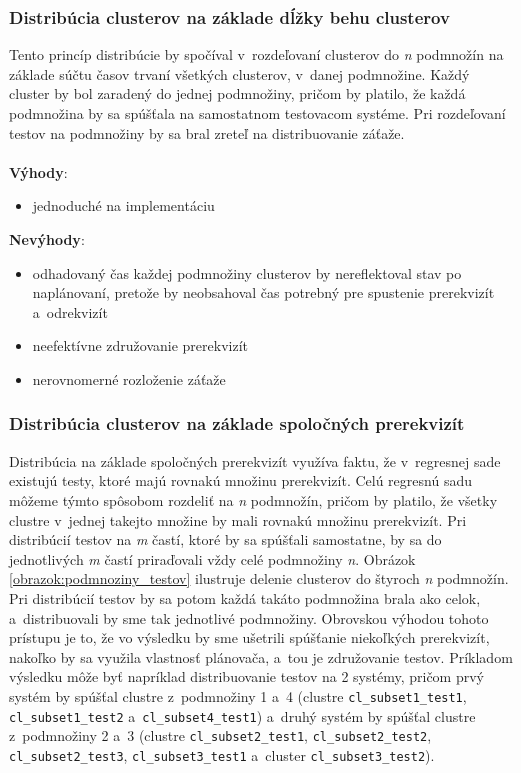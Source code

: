 \subsubsection*{Distribúcia clusterov na základe dĺžky behu clusterov}
Tento princíp distribúcie by spočíval v~rozdeľovaní clusterov do \textit{n} podmnožín na základe súčtu časov 
trvaní všetkých clusterov, v~danej podmnožine. Každý cluster by bol zaradený do jednej podmnožiny, pričom by platilo,
že každá podmnožina by sa spúšťala na samostatnom testovacom systéme. Pri rozdeľovaní testov na podmnožiny by sa bral zreteľ na
distribuovanie záťaže.
\\
\\
\noindent \textbf{Výhody}:
\begin{itemize}
\item jednoduché na implementáciu
\end{itemize} 

\noindent \textbf{Nevýhody}:
\begin{itemize}
\item odhadovaný čas každej podmnožiny clusterov by nereflektoval stav po naplánovaní, pretože by
neobsahoval čas potrebný pre spustenie prerekvizít a~odrekvizít
\item neefektívne združovanie prerekvizít
\item nerovnomerné rozloženie záťaže
\end{itemize}

\subsubsection*{Distribúcia clusterov na základe spoločných prerekvizít}
Distribúcia na základe spoločných prerekvizít využíva faktu, že v~regresnej sade existujú testy, ktoré majú rovnakú množinu prerekvizít.
Celú regresnú sadu môžeme týmto spôsobom rozdeliť na \emph{n} podmnožín, pričom by platilo, že všetky clustre v~jednej takejto množine by mali
rovnakú množinu prerekvizít. Pri distribúcií testov na \emph{m} častí, ktoré by sa spúšťali samostatne, by sa do jednotlivých \emph{m} častí
priraďovali vždy celé podmnožiny \emph{n}. Obrázok \ref{obrazok:podmnoziny_testov} ilustruje delenie clusterov do štyroch \emph{n} podmnožín.
Pri distribúcií testov by sa potom každá takáto podmnožina brala ako celok, a~distribuovali by sme tak jednotlivé podmnožiny.
Obrovskou výhodou tohoto prístupu je to, že vo výsledku by sme ušetrili spúšťanie niekoľkých prerekvizít, nakoľko by sa
využila vlastnosť plánovača, a~tou je združovanie testov. Príkladom výsledku môže byť napríklad distribuovanie testov na 2 systémy, 
pričom prvý systém by spúšťal clustre z~podmnožiny 1 a~4 (clustre \texttt{cl\_subset1\_test1}, \texttt{cl\_subset1\_test2} a~\texttt{cl\_subset4\_test1})
a~druhý systém by spúšťal clustre z~podmnožiny 2 a~3 (clustre \texttt{cl\_subset2\_test1}, \texttt{cl\_subset2\_test2}, 
\texttt{cl\_subset2\_test3}, \texttt{cl\_subset3\_test1} a~cluster \texttt{cl\_subset3\_test2}).


